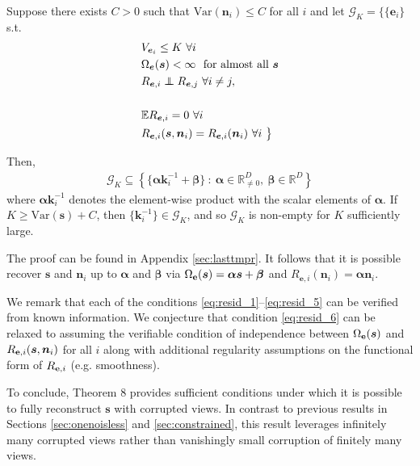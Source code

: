 \documentclass[letterpaper]{article}
\newcommand\independent{\protect\mathpalette{\protect\independenT}{\perp}}
\def\independenT#1#2{\mathrel{\rlap{$#1#2$}\mkern2mu{#1#2}}}
\theoremstyle{definition}
\begin{document}
\begin{theorem}
\label{thm:lastthm}
Suppose there exists $C>0$ such that $\text{Var}(\bm{n}_i) \leq C$ for all $i$ and let $\mathcal{G}_K = \big\lbrace
\{\bm{e}_i \}$ s.t.
\begin{align}
    & V_{\bm{e}_i} \leq K \ \forall i \label{eq:resid_1}\\
    & \Omega_{\bm{e}}(\bm{s}) < \infty \  \text{ for almost all } \bm{s} \label{eq:resid_2}\\
    &R_{\bm{e}, i} \independent R_{\bm{e}, j} \ \forall i \not= j, \label{eq:resid_3}\\
    \\    &\mathbb{E} R_{\bm{e}, i} = 0 \ \forall i \label{eq:resid_5} \\
    &R_{\bm{e}, i}(\bm{s}, \bm{n}_i) = R_{\bm{e}, i}(\bm{n}_i) \ \forall i \ \big\rbrace \label{eq:resid_6}
\end{align}

Then,
\begin{align*}
    \mathcal{G}_K \subseteq\left\lbrace \{ \bm{\alpha} \bm{k}^{-1}_i + \bm{\beta} \} \ : \ \bm{\alpha} \in \mathbb{R}^{D}_{\not=0}, \: \bm{\beta} \in \mathbb{R}^{D} \right\rbrace
\end{align*}
where $\bm\alpha \bm{k}^{-1}_i$ denotes the element-wise product with the scalar elements of $\bm{\alpha}$.
If $K \geq \text{Var}(\bm{s}) + C$, then $ \{ \bm{k}^{-1}_i \}  \in \mathcal{G}_K$,
and so $\mathcal{G}_K$ is non-empty for $K$ sufficiently large.
\end{theorem}
The proof can be found in Appendix \ref{sec:lasttmpr}.
It follows that it is possible recover $\bm{s}$ and $\bm{n}_i$ up to $\bm{\alpha}$ and $\bm{\beta}$ via $\Omega_{\mathbf{e}}(\bm{s}) = \bm{\alpha}\bm{s} + \bm{\beta}$ and $R_{\bm{e}, i}(\bm{n}_i) = \bm{\alpha}\bm{n}_i$.

We remark that each of the conditions \ref{eq:resid_1}--\ref{eq:resid_5} can be verified from known information.
We conjecture that condition \ref{eq:resid_6} can be relaxed to assuming the verifiable condition of independence between $\Omega_{\mathbf{e}}(\bm{s})$ and $R_{\mathbf{e}, i}(\bm{s}, \bm{n}_i)$ for all $i$ along with additional regularity assumptions on the functional form of $R_{\mathbf{e}, i}$ (e.g. smoothness).

To conclude, Theorem 8 provides sufficient conditions under which it is possible to fully reconstruct $\bm{s}$ with corrupted views.
In contrast to previous results in Sections \ref{sec:onenoisless} and \ref{sec:constrained}, this result leverages infinitely many corrupted views rather than vanishingly small corruption of finitely many views.
\end{document}
